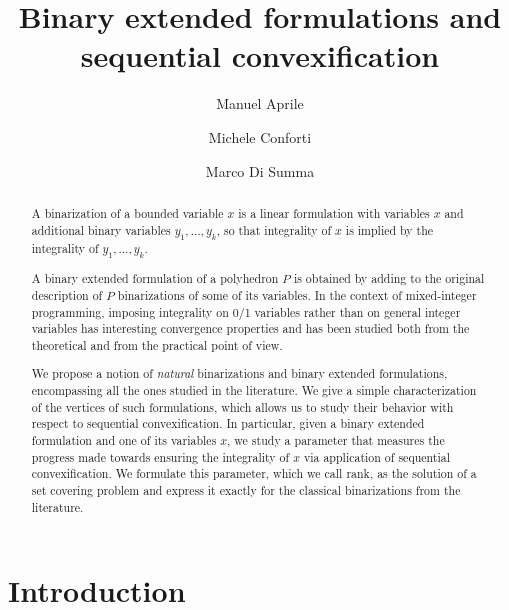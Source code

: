 \documentclass[11pt,a4paper]{article}
\title{Binary extended formulations and sequential convexification}
\author{Manuel Aprile \and Michele Conforti \and Marco Di Summa}
\newcommand{\1}{\textbf{1}}
\newcommand\manuel[1]{\textcolor{LimeGreen}{\textbf{ MA:  #1}}}
\newcommand\marco[1]{\textcolor{red}{\textbf{ MDS:  #1}}}
\begin{document}
\maketitle

\begin{abstract}
A binarization of a bounded variable $x$ is a linear formulation with variables $x$ and additional binary variables $y_1,\dots, y_k$, so that integrality of $x$ is implied by the integrality of  $y_1,\dots, y_k$.

A binary extended formulation of a polyhedron $P$ is obtained by adding to the original description of $P$ binarizations of some of its variables. In the context of mixed-integer programming, imposing integrality on 0/1 variables rather than on general integer variables has interesting convergence properties and has been studied both from the theoretical and from the practical point of view.

We propose a notion of \emph{natural} binarizations and binary extended formulations, encompassing all the ones studied in the literature. We give a simple characterization of the vertices of such formulations, which allows us to study their behavior with respect to  sequential convexification. %
In particular, given a binary extended formulation and %
 one of its variables $x$, we study a parameter  that measures the progress made towards ensuring the integrality of $x$ via application of sequential convexification. We formulate this parameter, which we call rank, as the solution of a set covering problem and express it exactly for the classical binarizations from the literature.

\end{abstract}


\section{Introduction}
\end{document}

